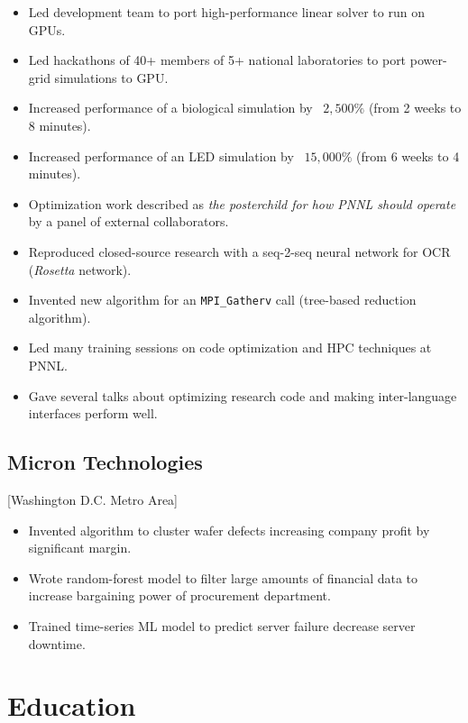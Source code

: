 \documentclass{mycv}
\begin{document}
\begin{itemize}
  \item Led development team to port high-performance linear solver to run on GPUs.
  \item Led hackathons of 40+ members of 5+ national laboratories to port power-grid simulations to GPU.
  \item Increased performance of a biological simulation by ~$2,500\%$ (from 2 weeks to 8 minutes).
  \item Increased performance of an LED simulation by ~$15,000\%$ (from 6 weeks to 4 minutes).
  \item Optimization work described as \textit{the posterchild for how PNNL should operate} by a panel of external collaborators.
  \item Reproduced closed-source research with a seq-2-seq neural network for OCR (\textit{Rosetta} network).
  \item Invented new algorithm for an \verb!MPI_Gatherv! call (tree-based reduction algorithm).
  \item Led many training sessions on code optimization and HPC techniques at PNNL.
  \item Gave several talks about optimizing research code and making inter-language interfaces perform well.
\end{itemize}

\subsection{Micron Technologies}[Washington D.C. Metro Area]
\begin{positions}
\end{positions}

\begin{itemize}
  \item Invented algorithm to cluster wafer defects increasing company profit by significant margin.
  \item Wrote random-forest model to filter large amounts of financial data to increase bargaining power of procurement department.
  \item Trained time-series ML model to predict server failure decrease server downtime.
\end{itemize}

\section{Education}
\end{document}
